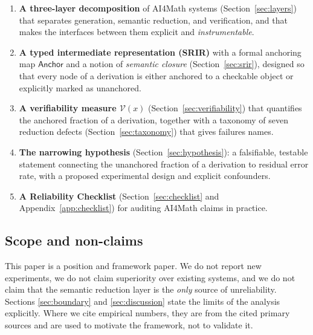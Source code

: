 \documentclass[11pt,a4paper]{article}
\theoremstyle{definition}
\theoremstyle{plain}
\theoremstyle{remark}
\newcommand{\Anch}{\mathsf{Anchor}}
\newcommand{\V}{\mathcal{V}}           %
\begin{document}
\begin{enumerate}
  \item \textbf{A three-layer decomposition} of AI4Math systems
        (Section~\ref{sec:layers}) that separates generation, semantic
        reduction, and verification, and that makes the interfaces between them
        explicit and \emph{instrumentable}.

  \item \textbf{A typed intermediate representation (SRIR)} with a formal
        anchoring map $\Anch$ and a notion of \emph{semantic closure}
        (Section~\ref{sec:srir}), designed so that every node of a derivation is
        either anchored to a checkable object or explicitly marked as
        unanchored.

  \item \textbf{A verifiability measure $\V(x)$} (Section~\ref{sec:verifiability})
        that quantifies the anchored fraction of a derivation, together with a
        taxonomy of seven reduction defects
        (Section~\ref{sec:taxonomy}) that gives failures names.

  \item \textbf{The narrowing hypothesis} (Section~\ref{sec:hypothesis}): a
        falsifiable, testable statement connecting the unanchored fraction of a
        derivation to residual error rate, with a proposed experimental design
        and explicit confounders.

  \item \textbf{A Reliability Checklist} (Section~\ref{sec:checklist} and
        Appendix~\ref{app:checklist}) for auditing AI4Math claims in practice.
\end{enumerate}

\subsection{Scope and non-claims}

This paper is a position and framework paper. We do not report new experiments,
we do not claim superiority over existing systems, and we do not claim that the
semantic reduction layer is the \emph{only} source of unreliability. Sections
\ref{sec:boundary} and \ref{sec:discussion} state the limits of the analysis
explicitly. Where we cite empirical numbers, they are from the cited primary
sources and are used to motivate the framework, not to validate it.

\end{document}
